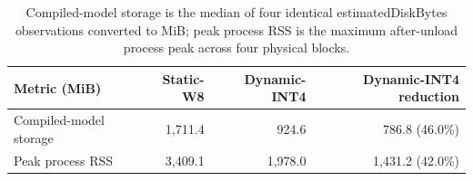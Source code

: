 \begin{table}[H]
\centering
\small
\setlength{\tabcolsep}{4pt}
\begin{tabular}{@{}lrrr@{}}
\toprule
Metric (MiB) & Static-W8 & Dynamic-INT4 & Dynamic-INT4 reduction \\
\midrule
Compiled-model storage & 1,711.4 & 924.6 & 786.8 (46.0\%) \\
Peak process RSS & 3,409.1 & 1,978.0 & 1,431.2 (42.0\%) \\
\bottomrule
\end{tabular}
\caption{Compiled-model storage is the median of four identical estimatedDiskBytes observations converted to MiB; peak process RSS is the maximum after-unload process peak across four physical blocks. }
\label{tab:size-rss}
\end{table}
